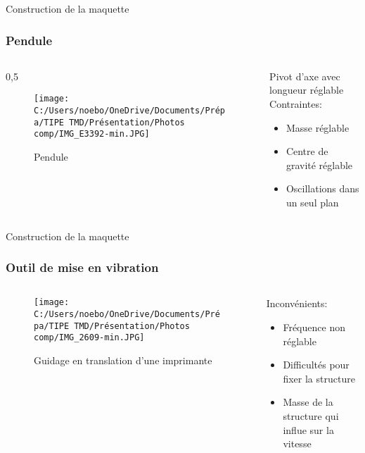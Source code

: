 \documentclass{beamer}
\begin{document}
	
	\begin{frame}{Construction de la maquette}
		\frametitle{Pendule}

		\begin{columns}
			\begin{column}{0,5\textwidth}
				\begin{figure}
					\texttt{[image: C:/Users/noebo/OneDrive/Documents/Prépa/TIPE TMD/Présentation/Photos comp/IMG\_E3392-min.JPG]}
					\caption{Pendule}
				\end{figure}
			\end{column}
		\begin{column}{0.5\textwidth}
					Pivot d'axe avec longueur réglable\vspace{24pt}
			Contraintes:
			\begin{itemize}
				\item Masse réglable
				\item Centre de gravité réglable
				\item Oscillations dans un seul plan
			\end{itemize}
		\end{column}
		\end{columns}
	\end{frame}

\begin{frame}{Construction de la maquette}
		\frametitle{Outil de mise en vibration}
		\begin{columns}
			\begin{column}{0.5\textwidth}
				\begin{figure}
					\texttt{[image: C:/Users/noebo/OneDrive/Documents/Prépa/TIPE TMD/Présentation/Photos comp/IMG\_2609-min.JPG]}
					\caption{Guidage en translation d'une imprimante}
				\end{figure}
			\end{column}
			\begin{column}{0.5\textwidth}
				Inconvénients:
				\begin{itemize}
					\item Fréquence non réglable \\
					\item Difficultés pour fixer la structure
					
					\item Masse de la structure qui influe sur la vitesse
				\end{itemize}

			\end{column}
		\end{columns}
	\end{frame}
\end{document}
